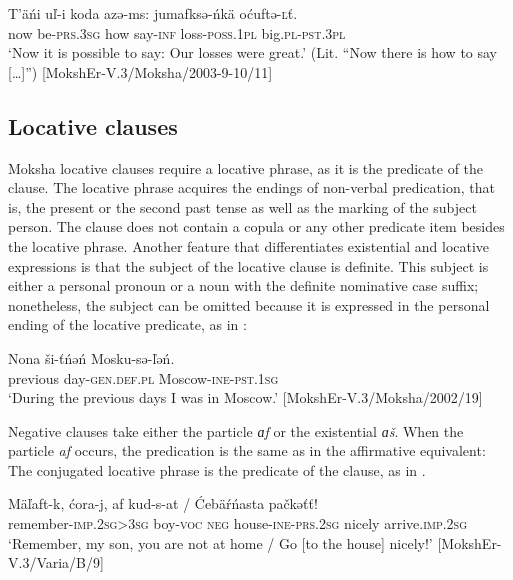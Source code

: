 \documentclass[output=paper,colorlinks,citecolor=brown,draft,draftmode]{langscibook}
\begin{document}
\ea\label{ex:moksha-loss}
\gll T’äńi uľ-i koda azə-ms: jumafksə-ńkä  oćuftə-\textsc{ľ}ť.\\
now be-\textsc{prs.3sg} how say-\textsc{inf} loss-\textsc{poss.1pl} big.\textsc{pl-pst.3pl}\\
\glt `Now it is possible to say: Our losses were great.' (Lit. ``Now there is how to say [\ldots]'') [MokshEr-V.3/Moksha/2003-9-10/11]
\z

\subsection{Locative clauses}\label{sec:2:5.3}

Moksha locative clauses require a locative phrase, as it is the predicate of the clause. The locative phrase acquires the endings of non-verbal predication, that is, the present or the second past tense as well as the marking of the subject person. The clause does not contain a copula or any other predicate item besides the locative phrase. Another feature that differentiates existential and locative expressions is that the subject of the locative clause is definite. This subject is either a personal pronoun or a noun with the definite nominative case suffix; nonetheless, the subject can be omitted because it is expressed in the personal ending of the locative predicate, as in :

\ea\label{ex:moksha-Moscow}
\gll Nona ši-ťńəń Mosku-sə-ľəń.\\
previous day-\textsc{gen.def.pl} Moscow-\textsc{ine-pst.1sg}\\
\glt `During the previous days I was in Moscow.' [MokshEr-V.3/Moksha/2002/19]
\z

  Negative clauses take either the particle \textit{ɑf} or the existential \textit{ɑš}. When the particle \textit{af} occurs, the predication is the same as in the affirmative equivalent: The conjugated locative phrase is the predicate of the clause, as in .

\ea\label{ex:moksha-nicely}
\gll Mäľaft-k, ćora-j, af kud-s-at / \'Cebäŕńasta pačkəťť!\\
remember-\textsc{imp.2sg>3sg} boy-\textsc{voc} \textsc{neg} house-\textsc{ine-prs.2sg} {} nicely arrive.\textsc{imp.2sg}\\
\glt `Remember, my son, you are not at home / Go [to the house] nicely!' [MokshEr-V.3/Varia/B/9]
\z
\end{document}
